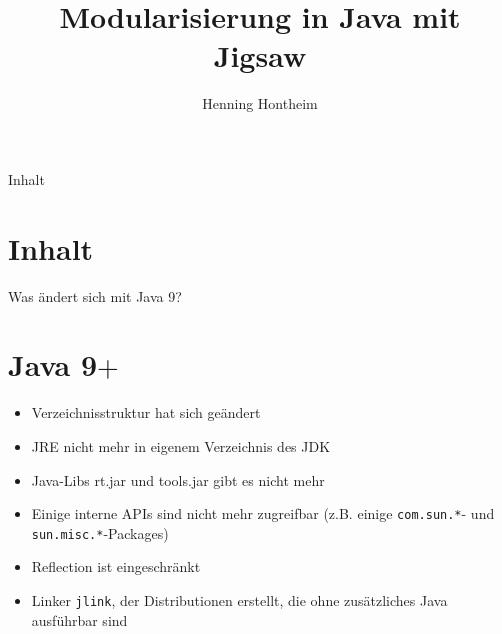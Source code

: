 \documentclass[aspectratio=169,x11names,11pt]{beamer}
\author[]{Henning Hontheim}
\title[]{Modularisierung in Java mit Jigsaw}
\date{}
\begin{document}

\begin{frame}[plain]{Inhalt}
\section*{Inhalt}
	\tableofcontents
\end{frame}

\begin{frame}{Was ändert sich mit Java 9?}
\section{Java 9$+$}
\begin{itemize}
	\item Verzeichnisstruktur hat sich geändert
	\item JRE nicht mehr in eigenem Verzeichnis des JDK
	\item Java-Libs rt.jar und tools.jar gibt es nicht mehr
	\item Einige interne APIs sind nicht mehr zugreifbar (z.B. einige \texttt{com.sun.*}- und \texttt{sun.misc.*}-Packages)
	\item Reflection ist eingeschränkt
	\item Linker \texttt{jlink}, der Distributionen erstellt, die ohne zusätzliches Java ausführbar sind
\end{itemize}
\end{frame}
\end{document}
